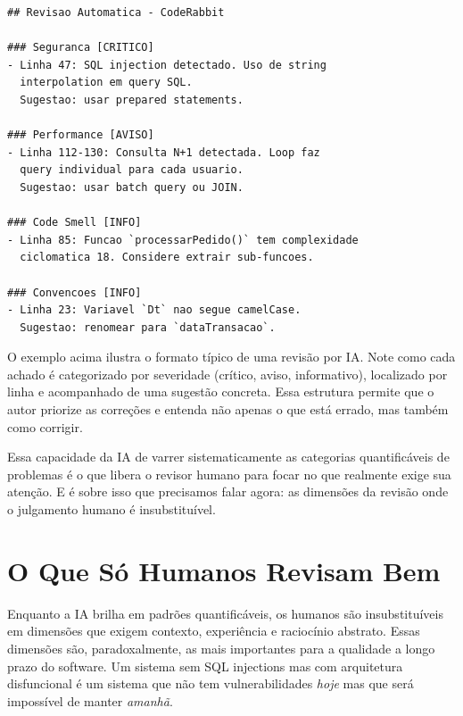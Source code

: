 \begin{lstlisting}[language={}, caption={Exemplo de Saída de Revisão por IA}]
## Revisao Automatica - CodeRabbit

### Seguranca [CRITICO]
- Linha 47: SQL injection detectado. Uso de string
  interpolation em query SQL.
  Sugestao: usar prepared statements.

### Performance [AVISO]
- Linha 112-130: Consulta N+1 detectada. Loop faz
  query individual para cada usuario.
  Sugestao: usar batch query ou JOIN.

### Code Smell [INFO]
- Linha 85: Funcao `processarPedido()` tem complexidade
  ciclomatica 18. Considere extrair sub-funcoes.

### Convencoes [INFO]
- Linha 23: Variavel `Dt` nao segue camelCase.
  Sugestao: renomear para `dataTransacao`.
\end{lstlisting}

O exemplo acima ilustra o formato típico de uma revisão por IA. Note como cada
achado é categorizado por severidade (crítico, aviso, informativo), localizado por
linha e acompanhado de uma sugestão concreta. Essa estrutura permite que o autor
priorize as correções e entenda não apenas o que está errado, mas também como
corrigir.

Essa capacidade da IA de varrer sistematicamente as categorias quantificáveis de
problemas é o que libera o revisor humano para focar no que realmente exige sua
atenção. E é sobre isso que precisamos falar agora: as dimensões da
revisão onde o julgamento humano é insubstituível.

\section{O Que Só Humanos Revisam Bem}

Enquanto a IA brilha em padrões quantificáveis, os humanos são insubstituíveis em
dimensões que exigem contexto, experiência e raciocínio abstrato. Essas dimensões
são, paradoxalmente, as mais importantes para a qualidade a longo prazo do software.
Um sistema sem SQL injections mas com arquitetura disfuncional é um sistema que não
tem vulnerabilidades \textit{hoje} mas que será impossível de manter \textit{amanhã}.

